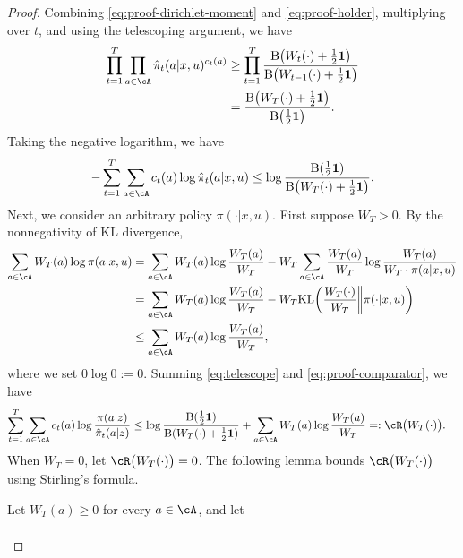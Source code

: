 \documentclass[11pt]{article}
\newcommand{\KL}{\text{KL}}
\begin{document}
\begin{proof}
Combining \eqref{eq:proof-dirichlet-moment} and
\eqref{eq:proof-holder}, multiplying over $t$, and using the telescoping argument, we have
\begin{align}
    \prod_{t=1}^T
    \prod_{a\in\cA}
    \hat\pi_t(a|x,u)^{c_{t}(a)}
    &\geq
    \prod_{t=1}^T
    \frac{
        \mathrm B\big(W_{t}(\cdot)+\frac12\mathbf 1\big)
    }{
        \mathrm B\big(W_{t-1}(\cdot)+\frac12\mathbf 1\big)
    }
    \notag\\
    &=
    \frac{
        \mathrm B\big(W_{T}(\cdot)+\frac12\mathbf 1\big)
    }{
        \mathrm B\big(\frac12\mathbf 1\big)
    }.
\notag
\end{align}
Taking the negative logarithm, we have
\begin{align}
    -\sum_{t=1}^T\sum_{a\in\cA}
    c_{t}(a)\log\hat\pi_t(a|x,u)
    \leq
    \log
    \frac{
        \mathrm B(\frac12\mathbf 1)
    }{
        \mathrm B\big(W_{T}(\cdot)+\frac12\mathbf 1\big)
    }.\label{eq:telescope}
\end{align}
Next, we consider an arbitrary
policy $\pi(\cdot|x,u)$. First suppose $W_T>0$. By the
nonnegativity of KL divergence,
\begin{align}
\notag
    \sum_{a\in\cA}W_T(a)\log\pi(a|x,u)
    &=
    \sum_{a\in\cA}
    W_T(a)\log\frac{W_T(a)}{W_T}
    -
    W_T
    \sum_{a\in \cA} \frac{W_T(a)}{W_T} \log \frac{W_T(a) }{W_T \cdot \pi(a|x,u)}\\
    &=\sum_{a\in\cA}
    W_T(a)\log\frac{W_T(a)}{W_T}
    -
    W_T
    \KL\bigg(
        \frac{W_T(\cdot)}{W_T}
        \bigg\|
        \pi(\cdot|x,u)
    \bigg)
    \notag\\
    &\leq
    \sum_{a\in\cA}
    W_T(a)\log\frac{W_T(a)}{W_T},
    \label{eq:proof-comparator}
\end{align}
where we set $0\log0:=0$. Summing \eqref{eq:telescope} and \eqref{eq:proof-comparator}, we have
\begin{align}
    \sum_{t=1}^T\sum_{a\in\cA}
    c_t(a)
    \log\frac{\pi(a|z)}{\hat\pi_t(a|z)}
    &\leq
    \log
    \frac{
        \mathrm B(\frac12\mathbf1)
    }{
        \mathrm B(W_T(\cdot)+\frac12\mathbf1)
    }
    +
    \sum_{a\in\cA}
    W_T(a)\log\frac{W_T(a)}{W_T}=: \cR\big(W_T(\cdot)\big).\notag
\end{align}
When $W_T=0$, let $\cR\big(W_T(\cdot)\big) = 0$. The following lemma bounds $\cR\big(W_T(\cdot)\big)$ using Stirling's formula.
\begin{lemma}
\label{lem:statewise-kt}
Let $W_T(a)\geq0$ for every $a\in\cA$, and let
\begin{align*}

\end{align*}
\end{lemma}
\end{proof}
\end{document}
